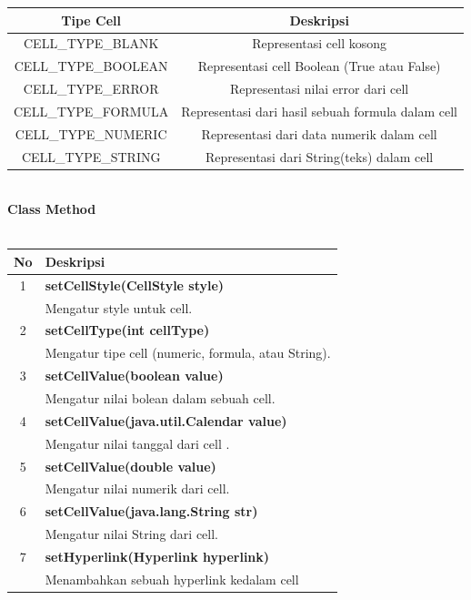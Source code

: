 	\begin{tabular}{|c|c|}
		\hline
		\textbf{Tipe Cell} & \textbf{Deskripsi} \\ \hline \hline
		CELL\_TYPE\_BLANK & Representasi cell kosong\\ \hline 
		CELL\_TYPE\_BOOLEAN &	Representasi cell Boolean (True atau False)\\ \hline 
		CELL\_TYPE\_ERROR & Representasi nilai error dari cell\\ \hline
		CELL\_TYPE\_FORMULA	&	Representasi dari hasil sebuah formula dalam cell\\ \hline
		CELL\_TYPE\_NUMERIC	&	Representasi dari data numerik dalam cell\\ \hline
		CELL\_TYPE\_STRING	&	Representasi dari String(teks) dalam cell\\ \hline
	\end{tabular}
	\\
	
\noindent \textbf{Class Method}\\ \\
	\begin{tabular}{|c|p{12cm}|}
		\hline
		\textbf{No} & \textbf{Deskripsi} \\ \hline \hline
		1 & \textbf{setCellStyle(CellStyle style)}\\
			&	Mengatur style untuk cell.\\ \hline 
		2 & \textbf{setCellType(int cellType)}\\
			&	Mengatur tipe cell (numeric, formula, atau String).\\ \hline
		3 & \textbf{setCellValue(boolean value)}\\
			&	Mengatur nilai bolean dalam sebuah cell.\\ \hline
		4 & \textbf{setCellValue(java.util.Calendar value)}\\
			&	Mengatur nilai tanggal dari cell .\\ \hline	
		5 & \textbf{setCellValue(double value)}\\
			&	Mengatur nilai numerik dari cell.\\ \hline
		6 & \textbf{setCellValue(java.lang.String str)}\\
			&	Mengatur nilai String dari cell.\\ \hline
		7 & \textbf{setHyperlink(Hyperlink hyperlink)}\\
			&	Menambahkan sebuah hyperlink kedalam cell\\ \hline					
	\end{tabular}

